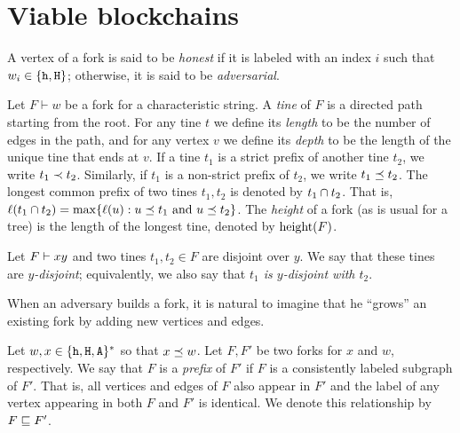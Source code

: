 \section{Viable blockchains}
  A vertex of a fork is said to be \emph{honest} 
  if it is labeled with an index $i$ such that $w_i \in \{\mathtt{h}, \mathtt{H}\}$; 
  otherwise, it is said to be \emph{adversarial}.

  \begin{definition}
    Let $F \vdash w$ be a fork for a characteristic string.  A
    \emph{tine} of $F$ is a directed path starting from the root. For
    any tine $t$ we define its \emph{length} to be the number of edges
    in the path, and for any vertex $v$ we define its \emph{depth} to be
    the length of the unique tine that ends at $v$. 
    If a tine $t_1$ is a strict prefix of another tine $t_2$, we write $t_1 \prec t_2$. 
    Similarly, if $t_1$ is a non-strict prefix of $t_2$, we write $t_1 \preceq t_2$.
    The longest common prefix of two tines $t_1, t_2$ is denoted by $t_1 \cap t_2$. 
    That is, $\ell(t_1 \cap t_2) = \max\{\ell(u) : \text{$u \preceq t_1$ and $u \preceq t_2$} \}$. 
    The \emph{height} of
    a fork (as is usual for a tree) 
    is the length of the longest tine,
    denoted by $\operatorname{height}(F)$. 
  \end{definition}
  Let $F \vdash xy$ and 
  two tines $t_1, t_2 \in F$ are disjoint over $y$. 
  We say that these tines are \emph{$y$-disjoint}; 
  equivalently, we also say that \emph{$t_1$ is $y$-disjoint with $t_2$}.

  When an adversary builds a fork, it is natural to imagine that 
  he ``grows'' an existing fork by adding new vertices and edges. 
  \begin{definition}
    Let $w, x \in \{\mathtt{h}, \mathtt{H}, \mathtt{A}\}^*$ so that $x\preceq w$. 
    Let $F, F'$ be two forks for $x$ and $w$, respectively. 
    We say that $F$ is a \emph{prefix} of $F'$ if 
    $F$ is a consistently labeled subgraph of $F'$. 
    That is, all vertices and edges of $F$ also appear in $F'$ and 
    the label of any vertex appearing in both $F$ and $F'$ is identical. 
    We denote this relationship by $F\sqsubseteq F'$.
  \end{definition}

